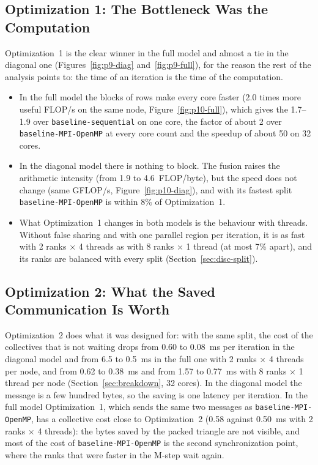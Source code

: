 \documentclass[conference,onecolumn]{IEEEtran}
\newcommand{\vseq}{\texttt{baseline-\allowbreak sequential}}
\newcommand{\vbase}{\texttt{baseline-\allowbreak MPI-\allowbreak OpenMP}}
\begin{document}
\subsection{Optimization 1: The Bottleneck Was the Computation}
Optimization~1 is the clear winner in the full model and almost a tie in the diagonal one (Figures~\ref{fig:p9-diag} and~\ref{fig:p9-full}), for the reason the rest of the analysis points to: the time of an iteration is the time of the computation.
\begin{itemize}
\item In the full model the blocks of rows make every core faster (2.0 times more useful FLOP/s on the same node, Figure~\ref{fig:p10-full}), which gives the 1.7--1.9 over \vseq{} on one core, the factor of about 2 over \vbase{} at every core count and the speedup of about 50 on 32 cores.
\item In the diagonal model there is nothing to block. The fusion raises the arithmetic intensity (from 1.9 to 4.6~FLOP/byte), but the speed does not change (same GFLOP/s, Figure~\ref{fig:p10-diag}), and with its fastest split \vbase{} is within 8\% of Optimization~1.
\item What Optimization~1 changes in both models is the behaviour with threads. Without false sharing and with one parallel region per iteration, it is as fast with 2 ranks $\times$ 4 threads as with 8 ranks $\times$ 1 thread (at most 7\% apart), and its ranks are balanced with every split (Section~\ref{sec:disc-split}).
\end{itemize}

\subsection{Optimization 2: What the Saved Communication Is Worth}\label{sec:disc-opt2}
Optimization~2 does what it was designed for: with the same split, the cost of the collectives that is not waiting drops from 0.60 to 0.08~ms per iteration in the diagonal model and from 6.5 to 0.5~ms in the full one with 2 ranks $\times$ 4 threads per node, and from 0.62 to 0.38~ms and from 1.57 to 0.77~ms with 8 ranks $\times$ 1 thread per node (Section~\ref{sec:breakdown}, 32 cores). In the diagonal model the message is a few hundred bytes, so the saving is one latency per iteration. In the full model Optimization~1, which sends the same two messages as \vbase{}, has a collective cost close to Optimization~2 (0.58 against 0.50~ms with 2 ranks $\times$ 4 threads): the bytes saved by the packed triangle are not visible, and most of the cost of \vbase{} is the second synchronization point, where the ranks that were faster in the M-step wait again.
\end{document}
